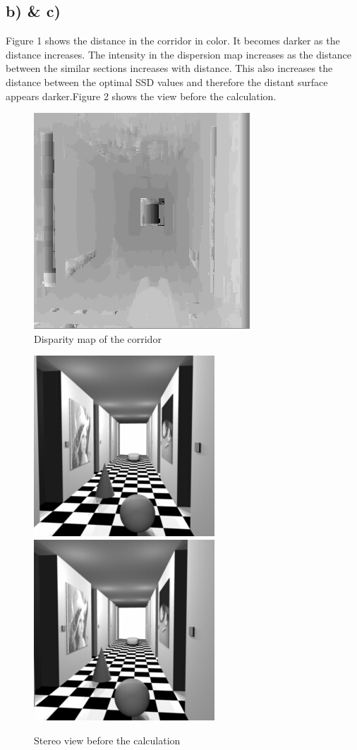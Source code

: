 \documentclass{article}
\begin{document}
	\subsection{b) \& c)}
	Figure 1 shows the distance in the corridor in color. It becomes darker as the distance increases. 
	The intensity in the dispersion map increases as the distance between the similar sections increases with distance. This also increases the distance between the optimal SSD values and therefore the distant surface appears darker.Figure 2 shows the view before the calculation.
	\begin{figure}
		\center
		\caption{Disparity map of the corridor}
		\includegraphics{corridor_disp.png}
		
	\end{figure}
	\begin{figure}
		\center
		\caption{Stereo view before the calculation}
		\includegraphics[scale=0.4]{corridorl.jpg}
		\includegraphics[scale=0.4]{corridorr.jpg}
	\end{figure}
	
	
\end{document}
